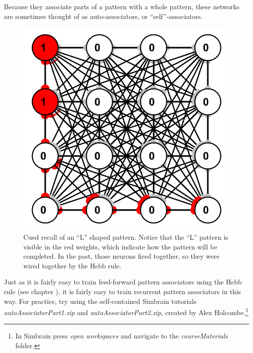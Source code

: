 Because they associate parts of a pattern with a whole pattern, these networks are sometimes thought of as auto-associators, or ``self''-associators.

\begin{figure}[h]
\centering
\includegraphics[scale=.45]{./images/patternCompletion_Cue}
\caption[Simbrain screenshot.]{Cued recall of an ``L'' shaped pattern. Notice that the ``L'' pattern is visible in the red weights, which indicate how the pattern will be completed. In the past, those neurons fired together, so they were wired together by the Hebb rule.}
\label{patternCompletionL}
\end{figure}

Just as it is fairly easy to train feed-forward pattern associators using the Hebb rule (see chapter ), it is fairly easy to train recurrent pattern associators in this way.  For practice, try using the self-contained Simbrain tutorials \emph{autoAssociatorPart1.zip} and \emph{autoAssociatorPart2.zip}, created by Alex Holcombe.\footnote{In Simbrain press \emph{open workspaces} and navigate to the \emph{courseMaterials} folder.}

